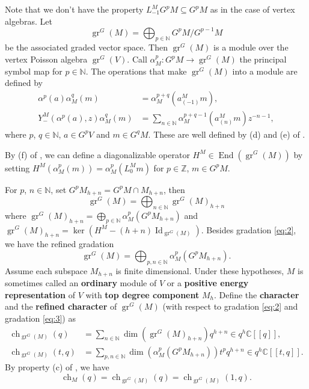 \documentclass[12pt, a4paper]{article}
\theoremstyle{remark}
\DeclareMathOperator{\Id}{Id}
\DeclareMathOperator{\gr}{gr}
\DeclareMathOperator{\End}{End}
\DeclareMathOperator{\ch}{ch}
\begin{document}
Note that we don't have the property $L_{-1}^MG^pM \subseteq G^pM$ as in the case of vertex algebras.
Let
\begin{equation*}
  \gr^G(M) = \bigoplus_{p \in \mathbb{N}}G^pM/G^{p - 1}M
\end{equation*}
be the associated graded vector space.
Then $\gr^G(M)$ is a module over the vertex Poisson algebra $\gr^G(V)$.
Call $\alpha^p_M: G^pM \to \gr^G(M)$ the principal symbol map for $p \in \mathbb{N}$.
The operations that make $\gr^G(M)$ into a module are defined by
\begin{align*}
  \alpha^p(a)\alpha^q_M(m) &= \alpha^{p+q}_M(a^M_{(-1)}m), \\
  Y^M_{-}(\alpha^p(a), z)\alpha^q_M(m) &= \sum_{n \in \mathbb{N}}\alpha^{p + q - 1}_M(a^M_{(n)}m)z^{-n - 1},
\end{align*}
where $p$, $q \in \mathbb{N}$, $a \in G^pV$ and $m \in G^qM$.
These are well defined by (d) and (e) of .

By (f) of , we can define a diagonalizable operator $H^M \in \End(\gr^G(M))$ by setting $H^M(\alpha^p_M(m)) = \alpha^p_M(L^M_0m)$ for $p \in \mathbb{Z}$, $m \in G^pM$.

For $p$, $n \in \mathbb{N}$, set $G^pM_{h + n} = G^pM \cap M_{h + n}$, then
\begin{equation}
  \label{eq:2}
  \gr^G(M)=\bigoplus_{n\in \mathbb{N}}\gr^G(M)_{h+n}
\end{equation}
where $\gr^G(M)_{h + n} = \bigoplus_{p \in \mathbb{N}}\alpha^p_M(G^pM_{h + n})$ and $\gr^G(M)_{h + n} = \ker(H^M - (h + n)\Id_{\gr^G(M)})$.
Besides gradation \eqref{eq:2}, we have the refined gradation
\begin{equation}
  \label{eq:3}
  \gr^G(M) = \bigoplus_{p, n \in \mathbb{N}}\alpha^p_M(G^pM_{h + n}).
\end{equation}
Assume each subspace $M_{h + n}$ is finite dimensional.
Under these hypotheses, $M$ is sometimes called an \textbf{ordinary} module of $V$ or  a \textbf{positive energy representation} of $V$ with \textbf{top degree component} $M_h$.
Define the \textbf{character} and the \textbf{refined character} of $\gr^G(M)$ (with respect to gradation \eqref{eq:2} and gradation \eqref{eq:3}) as
\begin{align*}
  \ch_{\gr^G(M)}(q) &= \sum_{n \in \mathbb{N}}\dim(\gr^G(M)_{h + n})q^{h + n} \in q^h\mathbb{C}[[q]],\\
  \ch_{\gr^G(M)}(t, q) &= \sum_{p, n \in \mathbb{N}}\dim(\alpha^p_M(G^pM_{h + n}))t^pq^{h + n} \in q^{h}\mathbb{C}[[t, q]].
\end{align*}
By property (c) of , we have
\begin{equation*}
  \ch_M(q) = \ch_{\gr^G(M)}(q) = \ch_{\gr^G(M)}(1, q).
\end{equation*}
\end{document}
